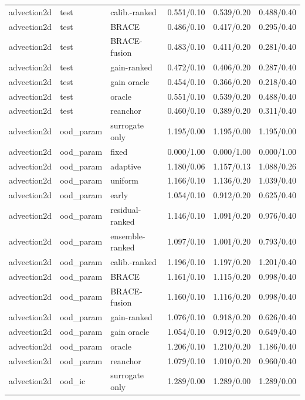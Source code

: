 \begin{tabular}{lllrrr}
advection2d & test & calib.-ranked & 0.551/0.10 & 0.539/0.20 & 0.488/0.40 \\
advection2d & test & BRACE & 0.486/0.10 & 0.417/0.20 & 0.295/0.40 \\
advection2d & test & BRACE-fusion & 0.483/0.10 & 0.411/0.20 & 0.281/0.40 \\
advection2d & test & gain-ranked & 0.472/0.10 & 0.406/0.20 & 0.287/0.40 \\
advection2d & test & gain oracle & 0.454/0.10 & 0.366/0.20 & 0.218/0.40 \\
advection2d & test & oracle & 0.551/0.10 & 0.539/0.20 & 0.488/0.40 \\
advection2d & test & reanchor & 0.460/0.10 & 0.389/0.20 & 0.311/0.40 \\
\midrule
advection2d & ood\_param & surrogate only & 1.195/0.00 & 1.195/0.00 & 1.195/0.00 \\
advection2d & ood\_param & fixed & 0.000/1.00 & 0.000/1.00 & 0.000/1.00 \\
advection2d & ood\_param & adaptive & 1.180/0.06 & 1.157/0.13 & 1.088/0.26 \\
advection2d & ood\_param & uniform & 1.166/0.10 & 1.136/0.20 & 1.039/0.40 \\
advection2d & ood\_param & early & 1.054/0.10 & 0.912/0.20 & 0.625/0.40 \\
advection2d & ood\_param & residual-ranked & 1.146/0.10 & 1.091/0.20 & 0.976/0.40 \\
advection2d & ood\_param & ensemble-ranked & 1.097/0.10 & 1.001/0.20 & 0.793/0.40 \\
advection2d & ood\_param & calib.-ranked & 1.196/0.10 & 1.197/0.20 & 1.201/0.40 \\
advection2d & ood\_param & BRACE & 1.161/0.10 & 1.115/0.20 & 0.998/0.40 \\
advection2d & ood\_param & BRACE-fusion & 1.160/0.10 & 1.116/0.20 & 0.998/0.40 \\
advection2d & ood\_param & gain-ranked & 1.076/0.10 & 0.918/0.20 & 0.626/0.40 \\
advection2d & ood\_param & gain oracle & 1.054/0.10 & 0.912/0.20 & 0.649/0.40 \\
advection2d & ood\_param & oracle & 1.206/0.10 & 1.210/0.20 & 1.186/0.40 \\
advection2d & ood\_param & reanchor & 1.079/0.10 & 1.010/0.20 & 0.960/0.40 \\
\midrule
advection2d & ood\_ic & surrogate only & 1.289/0.00 & 1.289/0.00 & 1.289/0.00 \\

\end{tabular}
